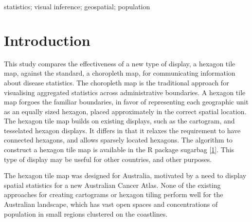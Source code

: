 \documentclass[conference,final,]{IEEEtran}
\begin{document}
\begin{IEEEkeywords}
statistics; visual inference; geospatial; population
\end{IEEEkeywords}




\maketitle


%
\IEEEpeerreviewmaketitle


\hypertarget{introduction}{%
\section{Introduction}\label{introduction}}

This study compares the effectiveness of a new type of display, a hexagon tile map, against the standard, a choropleth map, for communicating information about disease statistics. The choropleth map is the traditional approach for visualising aggregated statistics across administrative boundaries. A hexagon tile map forgoes the familiar boundaries, in favor of representing each geographic unit as an equally sized hexagon, placed approximately in the correct spatial location. The hexagon tile map builds on existing displays, such as the cartogram, and tesselated hexagon displays. It differs in that it relaxes the requirement to have connected hexagons, and allows sparsely located hexagons. The algorithm to construct a hexagon tile map is available in the R package sugarbag {[}\protect\hyperlink{ref-sugarbag}{1}{]}. This type of display may be useful for other countries, and other purposes.

The hexagon tile map was designed for Australia, motivated by a need to display spatial statistics for a new Australian Cancer Atlas. None of the existing approaches for creating cartograms or hexagon tiling perform well for the Australian landscape, which has vast open spaces and concentrations of population in small regions clustered on the coastlines.
\end{document}
